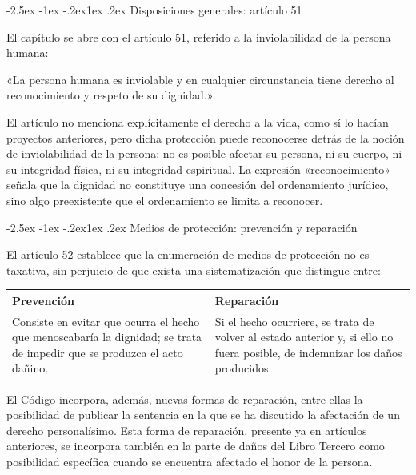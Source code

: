 \documentclass[12pt,oneside]{book}
\makeatletter
\renewcommand\subsection{\@startsection{subsection}{2}{\z@}%
  {-2.5ex \@plus -1ex \@minus -.2ex}{1ex \@plus .2ex}%
  {\normalfont\normalsize\bfseries}}
\makeatother
\begin{document}
\subsection{Disposiciones generales: artículo 51}

El capítulo se abre con el artículo 51, referido a la inviolabilidad de la persona humana:

\begin{regla}
«La persona humana es inviolable y en cualquier circunstancia tiene derecho al reconocimiento y respeto de su dignidad.»
\end{regla}

El artículo no menciona explícitamente el derecho a la vida, como sí lo hacían proyectos anteriores, pero dicha protección puede reconocerse detrás de la noción de inviolabilidad de la persona: no es posible afectar su persona, ni su cuerpo, ni su integridad física, ni su integridad espiritual. La expresión «reconocimiento» señala que la dignidad no constituye una concesión del ordenamiento jurídico, sino algo preexistente que el ordenamiento se limita a reconocer.

\subsection{Medios de protección: prevención y reparación}

El artículo 52 establece que la enumeración de medios de protección no es taxativa, sin perjuicio de que exista una sistematización que distingue entre:

\begin{table}[H]
\centering
\begin{tabular}{p{} p{}}
\toprule
\textbf{Prevención} & \textbf{Reparación} \\
\midrule
Consiste en evitar que ocurra el hecho que menoscabaría la dignidad; se trata de impedir que se produzca el acto dañino. &
Si el hecho ocurriere, se trata de volver al estado anterior y, si ello no fuera posible, de indemnizar los daños producidos. \\
\bottomrule
\end{tabular}
\end{table}

El Código incorpora, además, nuevas formas de reparación, entre ellas la posibilidad de publicar la sentencia en la que se ha discutido la afectación de un derecho personalísimo. Esta forma de reparación, presente ya en artículos anteriores, se incorpora también en la parte de daños del Libro Tercero como posibilidad específica cuando se encuentra afectado el honor de la persona.
\end{document}
